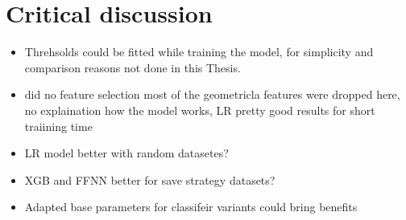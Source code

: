 \chapter{Critical discussion}
\label{chap:critical_discussion}
\begin{itemize}
    \item Threhsolds could be fitted while training the model, for simplicity and comparison reasons not done in this Thesis.
    \item \cite{zhang_learning-based_2022} did no feature selection most of the geometricla features were dropped here, no
          explaination how the model works, \gls{LR} pretty good results for short traiining time
    \item LR model better with random datasetes?
    \item XGB and FFNN better for save strategy datasets?
    \item Adapted base parameters for classifeir variants could bring benefits
\end{itemize}

\clearpage
